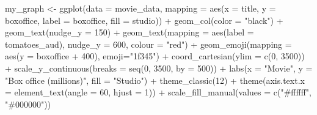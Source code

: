 \documentclass[
]{krantz}
\makeatletter
\newenvironment{Shaded}{\begin{snugshade}}{\end{snugshade}}
\newcommand{\AttributeTok}[1]{\textcolor[rgb]{0.61,0.61,0.61}{#1}}
\newcommand{\DecValTok}[1]{\textcolor[rgb]{0.06,0.06,0.06}{#1}}
\newcommand{\FunctionTok}[1]{\textcolor[rgb]{0,0,0}{#1}}
\newcommand{\NormalTok}[1]{#1}
\newcommand{\OtherTok}[1]{\textcolor[rgb]{0.37,0.37,0.37}{#1}}
\newcommand{\SpecialCharTok}[1]{\textcolor[rgb]{0,0,0}{#1}}
\newcommand{\StringTok}[1]{\textcolor[rgb]{0.5,0.5,0.5}{#1}}
\newenvironment{kframe}{%
\medskip{}
\setlength{\fboxsep}{.8em}
 \def\at@end@of@kframe{}%
 \ifinner\ifhmode%
  \def\at@end@of@kframe{\end{minipage}}%
  \begin{minipage}{\columnwidth}%
 \fi\fi%
 \def\FrameCommand##1{\hskip\@totalleftmargin \hskip-\fboxsep
 \colorbox{shadecolor}{##1}\hskip-\fboxsep
     \hskip-\linewidth \hskip-\@totalleftmargin \hskip\columnwidth}%
 \MakeFramed {\advance\hsize-\width
   \@totalleftmargin\z@ \linewidth\hsize
   \@setminipage}}%
 {\par\unskip\endMakeFramed%
 \at@end@of@kframe}
\renewenvironment{Shaded}{\begin{kframe}}{\end{kframe}}
\makeatother
\begin{document}
\begin{Shaded}
\begin{Highlighting}[]
\NormalTok{my\_graph }\OtherTok{\textless{}{-}} \FunctionTok{ggplot}\NormalTok{(}\AttributeTok{data =}\NormalTok{ movie\_data,}
           \AttributeTok{mapping =} \FunctionTok{aes}\NormalTok{(}\AttributeTok{x =}\NormalTok{ title,}
                         \AttributeTok{y =}\NormalTok{ boxoffice,}
                         \AttributeTok{label =}\NormalTok{ boxoffice, }
                         \AttributeTok{fill =}\NormalTok{ studio)) }\SpecialCharTok{+}
  \FunctionTok{geom\_col}\NormalTok{(}\AttributeTok{color =} \StringTok{"black"}\NormalTok{) }\SpecialCharTok{+}
  \FunctionTok{geom\_text}\NormalTok{(}\AttributeTok{nudge\_y =} \DecValTok{150}\NormalTok{)  }\SpecialCharTok{+}
  \FunctionTok{geom\_text}\NormalTok{(}\AttributeTok{mapping =} \FunctionTok{aes}\NormalTok{(}\AttributeTok{label =}\NormalTok{ tomatoes\_aud), }
            \AttributeTok{nudge\_y =} \DecValTok{600}\NormalTok{, }
            \AttributeTok{colour =} \StringTok{"red"}\NormalTok{) }\SpecialCharTok{+}
  \FunctionTok{geom\_emoji}\NormalTok{(}\AttributeTok{mapping =} \FunctionTok{aes}\NormalTok{(}\AttributeTok{y =}\NormalTok{ boxoffice }\SpecialCharTok{+} \DecValTok{400}\NormalTok{),}
             \AttributeTok{emoji=}\StringTok{"1f345"}\NormalTok{) }\SpecialCharTok{+}
  \FunctionTok{coord\_cartesian}\NormalTok{(}\AttributeTok{ylim =} \FunctionTok{c}\NormalTok{(}\DecValTok{0}\NormalTok{, }\DecValTok{3500}\NormalTok{)) }\SpecialCharTok{+}
  \FunctionTok{scale\_y\_continuous}\NormalTok{(}\AttributeTok{breaks =} \FunctionTok{seq}\NormalTok{(}\DecValTok{0}\NormalTok{, }\DecValTok{3500}\NormalTok{, }\AttributeTok{by =} \DecValTok{500}\NormalTok{)) }\SpecialCharTok{+}
  \FunctionTok{labs}\NormalTok{(}\AttributeTok{x =} \StringTok{"Movie"}\NormalTok{,}
       \AttributeTok{y =} \StringTok{"Box office (millions)"}\NormalTok{,}
       \AttributeTok{fill =} \StringTok{"Studio"}\NormalTok{) }\SpecialCharTok{+}
  \FunctionTok{theme\_classic}\NormalTok{(}\DecValTok{12}\NormalTok{) }\SpecialCharTok{+}
  \FunctionTok{theme}\NormalTok{(}\AttributeTok{axis.text.x =} \FunctionTok{element\_text}\NormalTok{(}\AttributeTok{angle =} \DecValTok{60}\NormalTok{, }
                                   \AttributeTok{hjust =} \DecValTok{1}\NormalTok{)) }\SpecialCharTok{+}
  \FunctionTok{scale\_fill\_manual}\NormalTok{(}\AttributeTok{values =} \FunctionTok{c}\NormalTok{(}\StringTok{"\#ffffff"}\NormalTok{, }\StringTok{"\#000000"}\NormalTok{))}
\end{Highlighting}
\end{Shaded}
\end{document}
